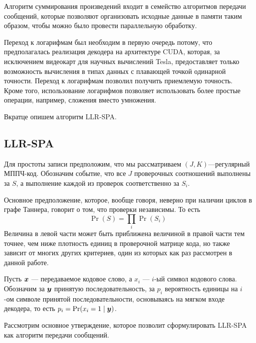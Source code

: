  Алгоритм суммирования произведений входит в семейство алгоритмов передачи сообщений, 
 которые позволяют организовать исходные данные в памяти
 таким образом, чтобы можно было провести параллельную обработку. 
 
 Переход к логарифмам был необходим в первую очередь потому, что предполагалась реализация декодера на 
 архитектуре CUDA, которая, за исключением видеокарт для научных вычислений Tesla, предоставляет только 
 возможность вычисления в типах данных с плавающей точкой одинарной точности. Переход
 к логарифмам позволил получить приемлемую точность. Кроме того, использование логарифмов позволяет
 использовать более простые операции, например, сложения вместо умножения.
 
 Вкратце опишем алгоритм LLR-SPA.
 
 \subsection{LLR-SPA}
 
 Для простоты записи предположим, что мы рассматриваем $(J,K)$---регулярный МППЧ-код.
 Обозначим событие, что все $J$ проверочных соотношений выполнены за $S$, а выполнение
 каждой из проверок соответственно за $S_i$.
 
  Основное предположение, которое, вообще говоря, неверно
 при наличии циклов в графе Таннера, говорит о том, что проверки независимы. То есть
 \[
 \Pr(S)=\prod_i \Pr(S_i)
 \]
 Величина в левой части может быть приближена величиной в правой части тем точнее, чем ниже
 плотность единиц в проверочной матрице кода, но также зависит от многих других критериев, один из
 которых как раз рассмотрен в данной работе.

Пусть $\boldsymbol{x}$ --- передаваемое кодовое слово, а $x_i$ --- $i$-ый символ кодового слова.
Обозначим за $\boldsymbol{y}$ принятую последовательность, за $p_i$ вероятность единицы на $i$-ом символе
принятой последовательности, основываясь на мягком входе декодера, то есть $p_i = \Pr(x_i=1\mid \boldsymbol{y})$.

Рассмотрим основное утверждение, которое позволит сформулировать LLR-SPA как алгоритм передачи
сообщений.


